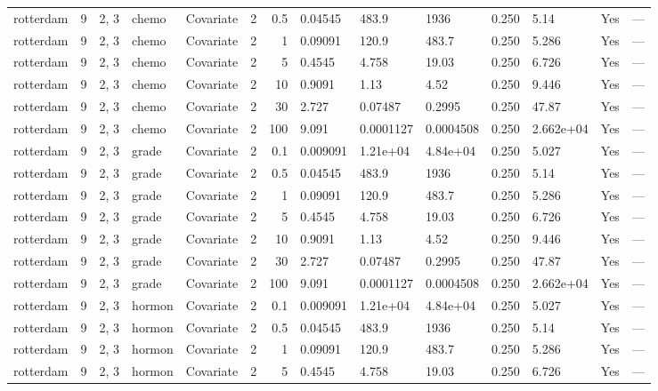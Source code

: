 \begin{tabular}{lrlllrrlllllll}
  rotterdam & 9 & 2, 3 & chemo & Covariate & 2 &   0.5 & 0.04545 & 483.9 & 1936 & 0.250 & 5.14 & Yes & --- \\ 
  rotterdam & 9 & 2, 3 & chemo & Covariate & 2 &     1 & 0.09091 & 120.9 & 483.7 & 0.250 & 5.286 & Yes & --- \\ 
  rotterdam & 9 & 2, 3 & chemo & Covariate & 2 &     5 & 0.4545 & 4.758 & 19.03 & 0.250 & 6.726 & Yes & --- \\ 
  rotterdam & 9 & 2, 3 & chemo & Covariate & 2 &    10 & 0.9091 & 1.13 & 4.52 & 0.250 & 9.446 & Yes & --- \\ 
  rotterdam & 9 & 2, 3 & chemo & Covariate & 2 &    30 & 2.727 & 0.07487 & 0.2995 & 0.250 & 47.87 & Yes & --- \\ 
  rotterdam & 9 & 2, 3 & chemo & Covariate & 2 &   100 & 9.091 & 0.0001127 & 0.0004508 & 0.250 & 2.662e+04 & Yes & --- \\ 
  rotterdam & 9 & 2, 3 & grade & Covariate & 2 &   0.1 & 0.009091 & 1.21e+04 & 4.84e+04 & 0.250 & 5.027 & Yes & --- \\ 
  rotterdam & 9 & 2, 3 & grade & Covariate & 2 &   0.5 & 0.04545 & 483.9 & 1936 & 0.250 & 5.14 & Yes & --- \\ 
  rotterdam & 9 & 2, 3 & grade & Covariate & 2 &     1 & 0.09091 & 120.9 & 483.7 & 0.250 & 5.286 & Yes & --- \\ 
  rotterdam & 9 & 2, 3 & grade & Covariate & 2 &     5 & 0.4545 & 4.758 & 19.03 & 0.250 & 6.726 & Yes & --- \\ 
  rotterdam & 9 & 2, 3 & grade & Covariate & 2 &    10 & 0.9091 & 1.13 & 4.52 & 0.250 & 9.446 & Yes & --- \\ 
  rotterdam & 9 & 2, 3 & grade & Covariate & 2 &    30 & 2.727 & 0.07487 & 0.2995 & 0.250 & 47.87 & Yes & --- \\ 
  rotterdam & 9 & 2, 3 & grade & Covariate & 2 &   100 & 9.091 & 0.0001127 & 0.0004508 & 0.250 & 2.662e+04 & Yes & --- \\ 
  rotterdam & 9 & 2, 3 & hormon & Covariate & 2 &   0.1 & 0.009091 & 1.21e+04 & 4.84e+04 & 0.250 & 5.027 & Yes & --- \\ 
  rotterdam & 9 & 2, 3 & hormon & Covariate & 2 &   0.5 & 0.04545 & 483.9 & 1936 & 0.250 & 5.14 & Yes & --- \\ 
  rotterdam & 9 & 2, 3 & hormon & Covariate & 2 &     1 & 0.09091 & 120.9 & 483.7 & 0.250 & 5.286 & Yes & --- \\ 
  rotterdam & 9 & 2, 3 & hormon & Covariate & 2 &     5 & 0.4545 & 4.758 & 19.03 & 0.250 & 6.726 & Yes & --- \\ 

\end{tabular}
